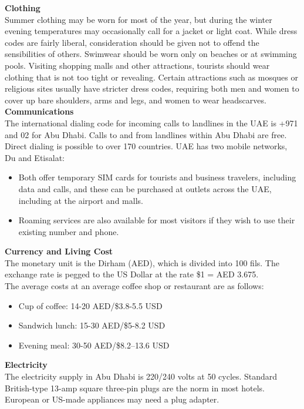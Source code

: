 {\large \textbf{Clothing}}\\
Summer clothing may be worn for most of the year, but during the winter evening temperatures may occasionally call for a jacket or light coat. 
While dress codes are fairly liberal, consideration should be given not to offend the sensibilities of others. 
Swimwear should be worn only on beaches or at swimming pools. Visiting shopping malls and other attractions, tourists should wear clothing that is not too tight or revealing. 
Certain attractions such as mosques or religious sites usually have stricter dress codes, requiring both men and women to cover up bare shoulders, arms and legs, and women to wear headscarves.\\

{\large \textbf{Communications}}\\
The international dialing code for incoming calls to landlines in the UAE is +971 and 02 for Abu Dhabi. 
Calls to and from landlines within Abu Dhabi are free. Direct dialing is possible to over 170 countries. 
UAE has two mobile networks, Du and Etisalat:
\begin{itemize}
    \item Both offer temporary SIM cards for tourists and business travelers, including data and calls, and these can be purchased at outlets across the UAE, including at the airport and malls.
    \item Roaming services are also available for most visitors if they wish to use their existing number and phone.
\end{itemize}

{\large \textbf{Currency and Living Cost}}\\
The monetary unit is the Dirham (AED), which is divided into 100 fils. The exchange rate is pegged to the US Dollar at the rate \$1 = AED 3.675.\\
The average costs at an average coffee shop or restaurant are as follows:
\begin{itemize}
    \item Cup of coffee: 14-20 AED/\$3.8-5.5 USD
    \item Sandwich lunch: 15-30 AED/\$5-8.2 USD
    \item Evening meal: 30-50 AED/\$8.2–13.6 USD
\end{itemize}

{\large \textbf{Electricity}}\\
The electricity supply in Abu Dhabi is 220/240 volts at 50 cycles.
Standard British-type 13-amp square three-pin plugs are the norm in most hotels. 
European or US-made appliances may need a plug adapter.\\

